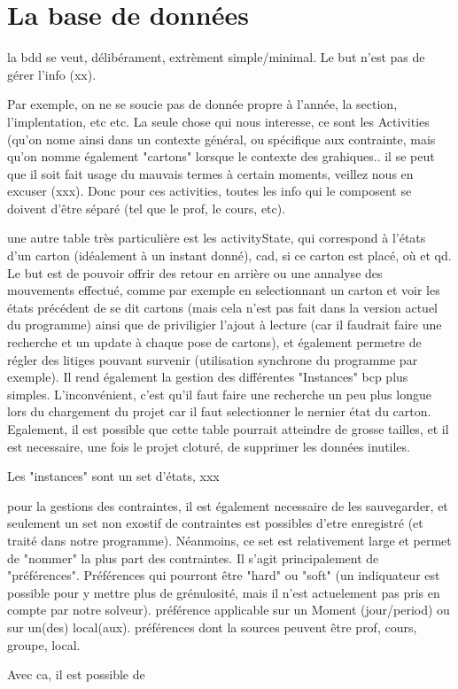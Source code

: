 \chapter{La base de données}
la bdd se veut, délibérament, extrèment simple/minimal.  Le but n'est pas de gérer l'info (xx).

Par exemple, on ne se soucie pas de donnée propre à l'année, la section, l'implentation, etc etc.  La seule chose qui nous interesse, ce sont les Activities (qu'on nome ainsi dans un contexte général, ou spécifique aux contrainte, mais qu'on nomme également "cartons" lorsque le contexte des grahiques.. il se peut que il soit fait usage du mauvais termes à certain moments, veillez nous en excuser (xxx).
Donc pour ces activities, toutes les info qui le composent se doivent d'être séparé (tel que le prof, le cours, etc).

une autre table très particulière est les activityState, qui correspond à l'états d'un carton (idéalement à un instant donné), cad, si ce carton est placé, où et qd.  Le but est de pouvoir offrir des retour en arrière ou une annalyse des mouvements effectué, comme par exemple en selectionnant un carton et voir les états précédent de se dit cartons (mais cela n'est pas fait dans la version actuel du programme) ainsi que de priviligier l'ajout à lecture (car il faudrait faire une recherche et un update à chaque pose de cartons), et également permetre de régler des litiges pouvant survenir (utilisation synchrone du programme par exemple).  Il rend également la gestion des différentes "Instances" bcp plus simples.  L'inconvénient, c'est qu'il faut faire une recherche un peu plus longue lors du chargement du projet car il faut selectionner le nernier état du carton. Egalement, il est possible que cette table pourrait atteindre de grosse tailles, et il est necessaire, une fois le projet cloturé, de supprimer les données inutiles. 

Les "instances" sont un set d'états, xxx

pour la gestions des contraintes, il est également necessaire de les sauvegarder, et seulement un set non exostif de contraintes est possibles d'etre enregistré (et traité dans notre programme). Néanmoins, ce set est relativement large et permet de "nommer" la plus part des contraintes.  Il s'agit principalement de "préférences".  Préférences qui pourront être "hard" ou "soft" (un indiquateur est possible pour y mettre plus de grénulosité, mais il n'est actuelement pas pris en compte par notre solveur).  préférence applicable sur un Moment (jour/period) ou sur un(des) local(aux).  préférences dont la sources peuvent être prof, cours, groupe, local.

Avec ca, il est possible de 

